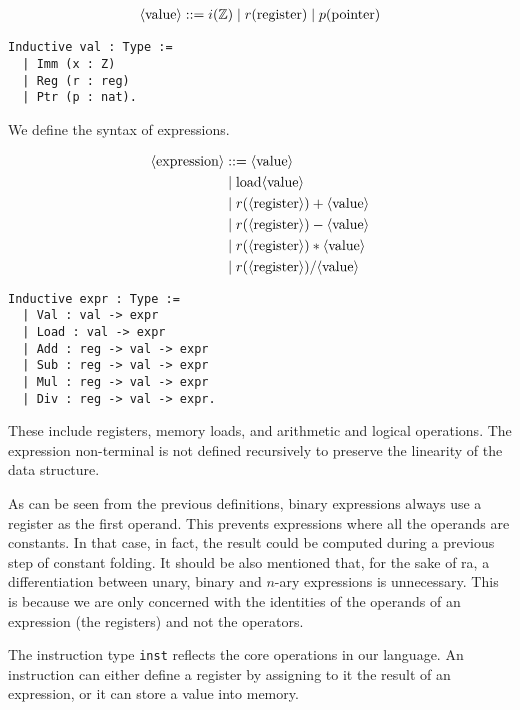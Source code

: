\begin{align*}
\langle\text{value}\rangle ::= i( \mathbb Z ) \mid r( \text{register} ) \mid p( \text{pointer} )
\end{align*}

\begin{lstlisting}[style=Rocq]
Inductive val : Type :=
  | Imm (x : Z)
  | Reg (r : reg)
  | Ptr (p : nat).
\end{lstlisting}

We define the syntax of expressions.

\begin{minipage}{0.45\textwidth}
\begin{align*}
\langle\text{expression}\rangle &::= \langle\text{value}\rangle \\
&\mid \text{load} \langle\text{value}\rangle \\
&\mid r( \langle\text{register}\rangle) + \langle\text{value}\rangle \\
&\mid r( \langle\text{register}\rangle) - \langle\text{value}\rangle \\
&\mid r( \langle\text{register}\rangle) * \langle\text{value}\rangle \\
&\mid r( \langle\text{register}\rangle) / \langle\text{value}\rangle \\
\end{align*}
\end{minipage}
\hfill
\begin{minipage}{0.45\textwidth}
\begin{lstlisting}[style=Rocq]
Inductive expr : Type :=
  | Val : val -> expr
  | Load : val -> expr
  | Add : reg -> val -> expr
  | Sub : reg -> val -> expr
  | Mul : reg -> val -> expr
  | Div : reg -> val -> expr.
\end{lstlisting}
\end{minipage}

These include registers, memory loads, and arithmetic and logical operations. The expression non-terminal is not defined recursively to preserve the linearity of the data structure.

As can be seen from the previous definitions, binary expressions always use a register as the first operand. This prevents expressions where all the operands are constants. In that case, in fact, the result could be computed during a previous step of constant folding. It should be also mentioned that, for the sake of \gls{ra}, a differentiation between unary, binary and $n$-ary expressions is unnecessary. This is because we are only concerned with the identities of the operands of an expression (the registers) and not the operators.

The instruction type \texttt{inst} reflects the core operations in our language. An instruction can either define a register by assigning to it the result of an expression, or it can store a value into memory.

